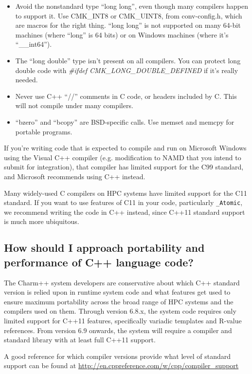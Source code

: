 \begin{itemize}
\item Avoid the nonstandard type ``long long'', even though many compilers
happen to support it.  Use CMK\_INT8 or CMK\_UINT8,
from conv-config.h, which are macros for the right thing.
``long long'' is not supported on many 64-bit machines (where ``long''
is 64 bits) or on Windows machines (where it's ``\_\_int64'').
\item The ``long double'' type isn't present on all compilers.  You can protect
long double code with {\em \#ifdef CMK\_LONG\_DOUBLE\_DEFINED} if it's really needed.
\item Never use C++ ``//'' comments in C code, or headers included by C.
This will not compile under many compilers. %
\item ``bzero'' and ``bcopy'' are BSD-specific calls.  
Use memset and memcpy for portable programs.
\end{itemize}

If you're writing code that is expected to compile and run on
Microsoft Windows using the Visual C++ compiler (e.g. modification to
NAMD that you intend to submit for integration), that compiler has
limited support for the C99 standard, and Microsoft recommends using
C++ instead.

Many widely-used C compilers on HPC systems have limited support for
the C11 standard. If you want to use features of C11 in your code,
particularly \verb|_Atomic|, we recommend writing the code in C++
instead, since C++11 standard support is much more ubiquitous.

\subsection{How should I approach portability and performance of C++ language code?}

The Charm++ system developers are conservative about which C++
standard version is relied upon in runtime system code and what
features get used to ensure maximum portability across the broad range
of HPC systems and the compilers used on them. Through version 6.8.x,
the system code requires only limited support for C++11 features,
specifically variadic templates and R-value references. From version
6.9 onwards, the system will require a compiler and standard library
with at least full C++11 support.

A good reference for which compiler versions
provide what level of standard support can be found at
\url{http://en.cppreference.com/w/cpp/compiler_support}

